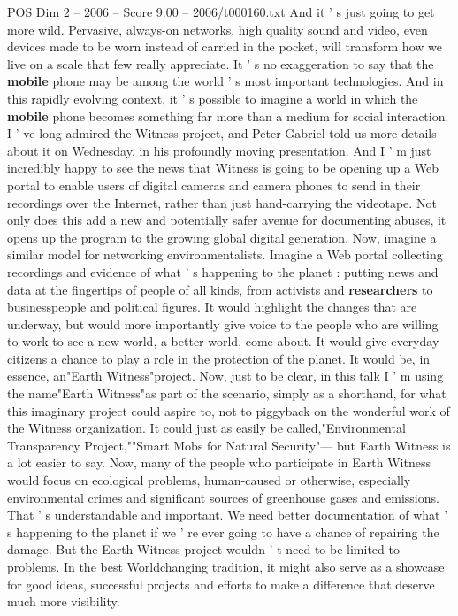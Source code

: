 \begin{textsample}{POS Dim 2 – 2006 – Score 9.00 – 2006/t000160.txt}
And it ' s just going to get more wild.
Pervasive, always-on networks, high quality sound and video, even devices made to be worn instead of carried in the pocket, will transform how we live on a scale that few really appreciate.
It ' s no exaggeration to say that the \textbf{mobile} phone may be among the world ' s most important technologies.
And in this rapidly evolving context, it ' s possible to imagine a world in which the \textbf{mobile} phone becomes something far more than a medium for social interaction.
I ' ve long admired the Witness project, and Peter Gabriel told us more details about it on Wednesday, in his profoundly moving presentation.
And I ' m just incredibly happy to see the news that Witness is going to be opening up a Web portal to enable users of digital cameras and camera phones to send in their recordings over the Internet, rather than just hand-carrying the videotape.
Not only does this add a new and potentially safer avenue for documenting abuses, it opens up the program to the growing global digital generation.
Now, imagine a similar model for networking environmentalists.
Imagine a Web portal collecting recordings and evidence of what ' s happening to the planet : putting news and data at the fingertips of people of all kinds, from activists and \textbf{researchers} to businesspeople and political figures.
It would highlight the changes that are underway, but would more importantly give voice to the people who are willing to work to see a new world, a better world, come about.
It would give everyday citizens a chance to play a role in the protection of the planet.
It would be, in essence, an"Earth Witness"project.
Now, just to be clear, in this talk I ' m using the name"Earth Witness"as part of the scenario, simply as a shorthand, for what this imaginary project could aspire to, not to piggyback on the wonderful work of the Witness organization.
It could just as easily be called,"Environmental Transparency Project,""Smart Mobs for Natural Security"— but Earth Witness is a lot easier to say.
Now, many of the people who participate in Earth Witness would focus on ecological problems, human-caused or otherwise, especially environmental crimes and significant sources of greenhouse gases and emissions.
That ' s understandable and important.
We need better documentation of what ' s happening to the planet if we ' re ever going to have a chance of repairing the damage.
But the Earth Witness project wouldn ' t need to be limited to problems.
In the best Worldchanging tradition, it might also serve as a showcase for good ideas, successful projects and efforts to make a difference that deserve much more visibility.

\end{textsample}
